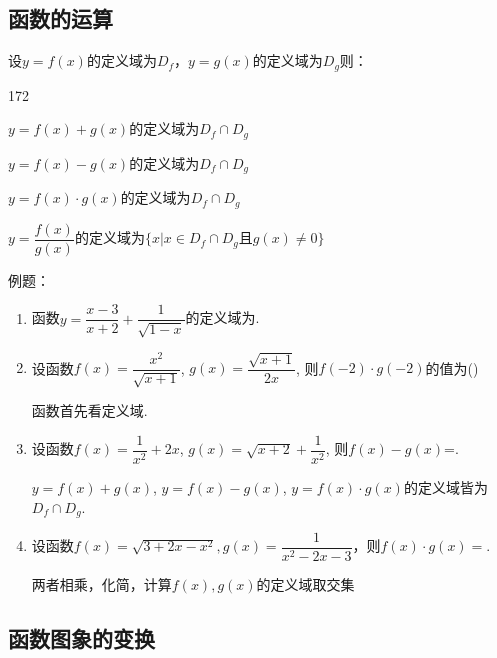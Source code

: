 \subsection*{函数的运算}
设$y = f(x)$的定义域为$D_f$，$y = g(x)$的定义域为$D_g$则：
\begin{dingautolist}{172}
    \item $y = f(x) + g(x)$的定义域为$D_f \cap D_g$
    \item $y = f(x) - g(x)$的定义域为$D_f \cap D_g$
    \item $y = f(x) \cdot g(x)$的定义域为$D_f \cap D_g$
    \item $y = \dfrac{f(x)}{g(x)}$的定义域为$\{x | x \in D_f \cap D_g \mbox{且} g(x) \neq 0 \}$
\end{dingautolist}
例题：
\begin{enumerate}
    \item 函数$y=\dfrac{x-3}{x+2}+\dfrac{1}{\sqrt{1-x}}$的定义域为.
    
    \item 设函数$f(x)=\dfrac{x^2}{\sqrt{x+1}}$, $g(x)=\dfrac{\sqrt{x+1}}{2x}$, 则$f(-2)\cdot g(-2)$的值为\dotfill()
    \begin{jieda}
    函数首先看定义域. 
    \end{jieda}
    \item 设函数$f(x)=\dfrac{1}{x^2}+2x$, $g(x)=\sqrt{x+2}+\dfrac{1}{x^2}$, 则$f(x)-g(x)$=. 
    \begin{jieda}
    $y=f(x)+g(x)$, $y=f(x)-g(x)$, $y=f(x)\cdot g(x)$的定义域皆为$D_f\cap D_g$. 
    \end{jieda}
    \item 设函数$f(x) = \sqrt{3+2x-x^2}, g(x) = \dfrac{1}{x^2-2x-3}$，则$f(x) \cdot g(x)=$.
    \begin{jieda}
    两者相乘，化简，计算$f(x), g(x)$的定义域取交集
    \end{jieda}
\end{enumerate}
\subsection*{函数图象的变换}


